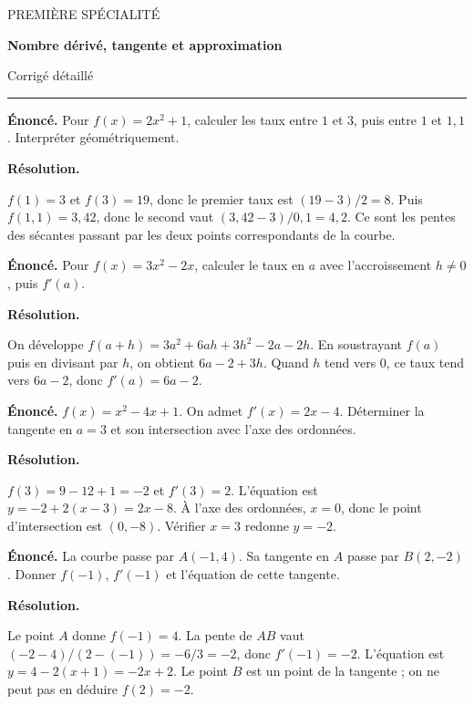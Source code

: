 \documentclass[11pt,a4paper]{article}
\begin{document}
{\small\color{Blue}PREMIÈRE SPÉCIALITÉ}\par{\LARGE\bfseries Nombre dérivé, tangente et approximation}\par{\large Corrigé détaillé}\par\vspace{0.2cm}\hrule\vspace{0.4cm}
\par\noindent\begin{minipage}{\linewidth}
{\small\color{Muted}\textbf{Énoncé.} Pour $f(x)=2x^2+1$, calculer les taux entre $1$ et $3$, puis entre $1$ et $1,1$. Interpréter géométriquement.}
\par\medskip
\textbf{Résolution.}\par
$f(1)=3$ et $f(3)=19$, donc le premier taux est $(19-3)/2=8$. Puis $f(1,1)=3,42$, donc le second vaut $(3,42-3)/0,1=4,2$. Ce sont les pentes des sécantes passant par les deux points correspondants de la courbe.
\end{minipage}\par
\par\noindent\begin{minipage}{\linewidth}
{\small\color{Muted}\textbf{Énoncé.} Pour $f(x)=3x^2-2x$, calculer le taux en $a$ avec l’accroissement $h\ne0$, puis $f\prime(a)$.}
\par\medskip
\textbf{Résolution.}\par
On développe $f(a+h)=3a^2+6ah+3h^2-2a-2h$. En soustrayant $f(a)$ puis en divisant par $h$, on obtient $6a-2+3h$. Quand $h$ tend vers $0$, ce taux tend vers $6a-2$, donc $f\prime(a)=6a-2$.
\end{minipage}\par
\par\noindent\begin{minipage}{\linewidth}
{\small\color{Muted}\textbf{Énoncé.} $f(x)=x^2-4x+1$. On admet $f\prime(x)=2x-4$. Déterminer la tangente en $a=3$ et son intersection avec l’axe des ordonnées.}
\par\medskip
\textbf{Résolution.}\par
$f(3)=9-12+1=-2$ et $f\prime(3)=2$. L’équation est $y=-2+2(x-3)=2x-8$. À l’axe des ordonnées, $x=0$, donc le point d’intersection est $(0,-8)$. Vérifier $x=3$ redonne $y=-2$.
\end{minipage}\par
\par\noindent\begin{minipage}{\linewidth}
{\small\color{Muted}\textbf{Énoncé.} La courbe passe par $A(-1,4)$. Sa tangente en $A$ passe par $B(2,-2)$. Donner $f(-1)$, $f\prime(-1)$ et l’équation de cette tangente.}
\par\medskip
\textbf{Résolution.}\par
Le point $A$ donne $f(-1)=4$. La pente de $AB$ vaut $(-2-4)/(2-(-1))=-6/3=-2$, donc $f\prime(-1)=-2$. L’équation est $y=4-2(x+1)=-2x+2$. Le point $B$ est un point de la tangente ; on ne peut pas en déduire $f(2)=-2$.
\end{minipage}\par
\end{document}
